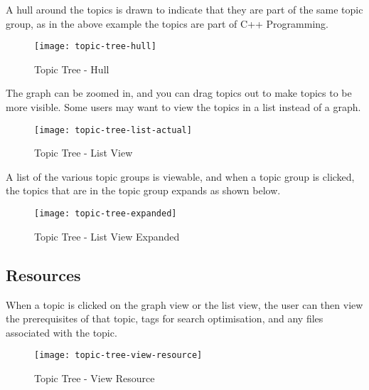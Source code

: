 A hull around the topics is drawn to indicate that they are part of the same topic group, as in the above example the topics are part of C++ Programming.\\

\begin{figure}[h!]
    \centering
    \texttt{[image: topic-tree-hull]}
    \caption{Topic Tree - Hull}
\end{figure}

The graph can be zoomed in, and you can drag topics out to make topics to be more visible. Some users may want to view the topics in a list instead of a graph.\\

\begin{figure}[h!]
    \centering
    \texttt{[image: topic-tree-list-actual]}
    \caption{Topic Tree - List View}
\end{figure}

A list of the various topic groups is viewable, and when a topic group is clicked, the topics that are in the topic group expands as shown below.\\

\begin{figure}[h!]
    \centering
    \texttt{[image: topic-tree-expanded]}
    \caption{Topic Tree - List View Expanded}
\end{figure}

\subsection{Resources}

When a topic is clicked on the graph view or the list view, the user can then view the prerequisites of that topic, tags for search optimisation, and any files associated with the topic.

\begin{figure}[h!]
    \centering
    \texttt{[image: topic-tree-view-resource]}
    \caption{Topic Tree - View Resource}
\end{figure}

